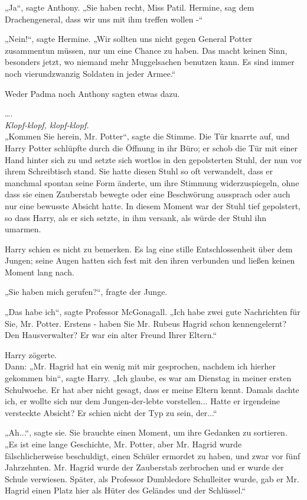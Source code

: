 {„Ja“, sagte Anthony. „Sie haben recht, Miss Patil. Hermine, sag dem Drachengeneral, dass wir uns mit ihm treffen wollen -“

„Nein!“, sagte Hermine. „Wir sollten uns nicht gegen General Potter zusammentun müssen, nur um eine Chance zu haben. Das macht keinen Sinn, besonders jetzt, wo niemand mehr Muggelsachen benutzen kann. Es sind immer noch vierundzwanzig Soldaten in jeder Armee.“

Weder Padma noch Anthony sagten etwas dazu.

….\\ \emph{Klopf-klopf, klopf-klopf.}\\ „Kommen Sie herein, Mr. Potter“, sagte die Stimme. Die Tür knarrte auf, und Harry Potter schlüpfte durch die Öffnung in ihr Büro; er schob die Tür mit einer Hand hinter sich zu und setzte sich wortlos in den gepolsterten Stuhl, der nun vor ihrem Schreibtisch stand. Sie hatte diesen Stuhl so oft verwandelt, dass er manchmal spontan seine Form änderte, um ihre Stimmung widerzuspiegeln, ohne dass sie einen Zauberstab bewegte oder eine Beschwörung aussprach oder auch nur eine bewusste Absicht hatte. In diesem Moment war der Stuhl tief gepolstert, so dass Harry, als er sich setzte, in ihm versank, als würde der Stuhl ihn umarmen.

Harry schien es nicht zu bemerken. Es lag eine stille Entschlossenheit über dem Jungen; seine Augen hatten sich fest mit den ihren verbunden und ließen keinen Moment lang nach.

„Sie haben mich gerufen?“, fragte der Junge.

„Das habe ich“, sagte Professor McGonagall. „Ich habe zwei gute Nachrichten für Sie, Mr. Potter. Erstens - haben Sie Mr. Rubeus Hagrid schon kennengelernt? Den Hausverwalter? Er war ein alter Freund Ihrer Eltern.“

Harry zögerte.\\ Dann: „Mr. Hagrid hat ein wenig mit mir gesprochen, nachdem ich hierher gekommen bin“, sagte Harry. „Ich glaube, es war am Dienstag in meiner ersten Schulwoche. Er hat aber nicht gesagt, dass er meine Eltern kennt. Damals dachte ich, er wollte sich nur dem Jungen-der-lebte vorstellen... Hatte er irgendeine versteckte Absicht? Er schien nicht der Typ zu sein, der...“

„Ah...“, sagte sie. Sie brauchte einen Moment, um ihre Gedanken zu sortieren. „Es ist eine lange Geschichte, Mr. Potter, aber Mr. Hagrid wurde fälschlicherweise beschuldigt, einen Schüler ermordet zu haben, und zwar vor fünf Jahrzehnten. Mr. Hagrid wurde der Zauberstab zerbrochen und er wurde der Schule verwiesen. Später, als Professor Dumbledore Schulleiter wurde, gab er Mr. Hagrid einen Platz hier als Hüter des Geländes und der Schlüssel.“

}
